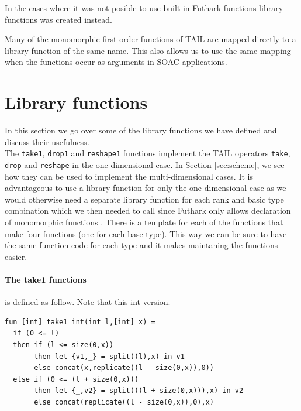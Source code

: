 \documentclass[11pt]{article}
\begin{document}
In the cases where it was not posible to use built-in Futhark functions library functions was created instead. 

Many of the monomorphic first-order functions of TAIL are mapped directly to a library function of the same name. This also allows us to use the same mapping when the functions occur as arguments in SOAC applications.\\


\section{Library functions}
In this section we go over some of the library functions we have defined and discuss their usefulness.\\

The {\tt take1}, {\tt drop1} and {\tt reshape1} functions implement the TAIL operators {\tt take}, {\tt drop} and {\tt reshape} in the one-dimensional case. In Section \ref{sec:scheme}, we see how they can be used to implement the multi-dimensional cases. It is advantageous to use a library function for only the one-dimensional case as we would otherwise need a separate library function for each 
rank and basic type combination which we then needed to call since Futhark only allows declaration of monomorphic functions \cite{TroelsHenriksen}.
There is a template for each of the functions that make four functions (one for each base type). This way we can be sure to have the same function code for each type and it makes maintaning the functions easier. 

\paragraph{The take1 functions} is defined as follow. Note that this int version.
\begin{lstlisting}[language=Futhark]
fun [int] take1_int(int l,[int] x) =
  if (0 <= l)
  then if (l <= size(0,x))
       then let {v1,_} = split((l),x) in v1
       else concat(x,replicate((l - size(0,x)),0))
  else if (0 <= (l + size(0,x)))
       then let {_,v2} = split(((l + size(0,x))),x) in v2
       else concat(replicate((l - size(0,x)),0),x)
\end{lstlisting}
\end{document}
